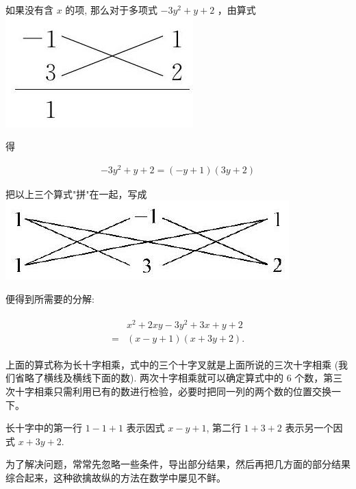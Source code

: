 \documentclass[10pt]{article}
\begin{document}
如果没有含 $x$ 的项, 那么对于多项式 $-3 y^{2}+y+2$ ，由算式\\
\includegraphics[max width=\textwidth, center]{2024_10_30_bd799899fef40368a068g-041}

得

\begin{align*}
-3 y^{2}+y+2=(-y+1)(3 y+2)
\end{align*}

把以上三个算式"拼"在一起，写成\\
\includegraphics[max width=\textwidth, center]{2024_10_30_bd799899fef40368a068g-042}

便得到所需要的分解:

\begin{align*}
\begin{aligned}
& x^{2}+2 x y-3 y^{2}+3 x+y+2 \\
= & (x-y+1)(x+3 y+2) .
\end{aligned}
\end{align*}

上面的算式称为长十字相乘，式中的三个十字叉就是上面所说的三次十字相乘 (我们省略了横线及横线下面的数). 两次十字相乘就可以确定算式中的 6 个数，第三次十字相乘只需利用已有的数进行检验，必要时把同一列的两个数的位置交换一下。

长十字中的第一行 $1-1+1$ 表示因式 $x-y+1$, 第二行 $1+3+2$ 表示另一个因式 $x+3 y+2$.

为了解决问题，常常先忽略一些条件，导出部分结果，然后再把几方面的部分结果综合起来，这种欲擒故纵的方法在数学中屡见不鲜。
\end{document}
